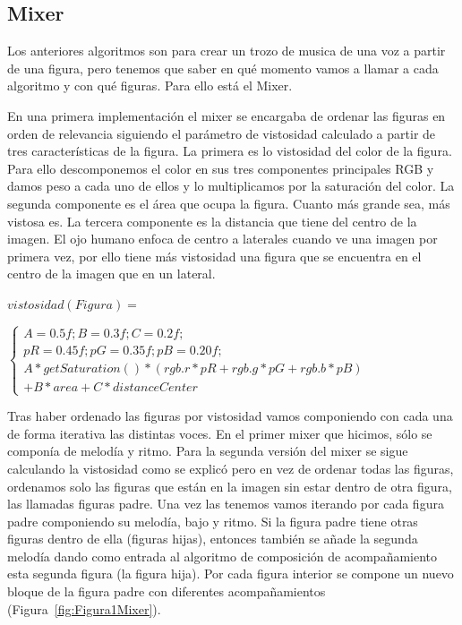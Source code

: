 
\subsection{Mixer}

Los anteriores algoritmos son para crear un trozo de musica de una voz a partir de una figura, pero tenemos que saber en qué momento vamos a llamar a cada algoritmo y con qué figuras. Para ello está el Mixer.

En una primera implementación el mixer se encargaba de ordenar las figuras en orden de relevancia siguiendo el parámetro de vistosidad calculado a partir de tres características de la figura.
La primera es lo vistosidad del color de la figura. Para ello descomponemos el color en sus tres componentes principales RGB y damos peso a cada uno de ellos y lo multiplicamos por la saturación del color.
La segunda componente es el área que ocupa la figura. Cuanto más grande sea, más vistosa es.
La tercera componente es la distancia que tiene del centro de la imagen. El ojo humano enfoca de centro a laterales cuando ve una imagen por primera vez, por ello tiene más vistosidad una figura que se encuentra en el centro de la imagen que en un lateral.

	\begin{center}
		$vistosidad(Figura) =$
	\end{center}
	\begin{center}
		
		$\left\{
		\begin{array}{cc}
		A = 0.5f; B = 0.3f; C = 0.2f;\\ 
		pR = 0.45f; pG = 0.35f; pB = 0.20f;\\
		A*getSaturation()*(rgb.r*pR + rgb.g*pG + rgb.b*pB)\\
		 + B*area + C*distanceCenter
		\end{array}\right.$
	\end{center}

Tras haber ordenado las figuras por vistosidad vamos componiendo con cada una de forma iterativa las distintas voces. En el primer mixer que hicimos, sólo se componía  de melodía y ritmo. Para la segunda versión del mixer se sigue calculando la vistosidad como se explicó pero en vez de ordenar todas las figuras, ordenamos solo las figuras que están en la imagen sin estar dentro de otra figura, las llamadas figuras padre. Una vez las tenemos vamos iterando por cada figura padre componiendo su melodía, bajo y ritmo. Si la figura padre tiene otras figuras dentro de ella (figuras hijas), entonces también se añade la segunda melodía dando como entrada al algoritmo de composición de acompañamiento esta segunda figura (la figura hija). Por cada figura interior se compone un nuevo bloque de la figura padre con diferentes acompañamientos (Figura~\ref{fig:Figura1Mixer}).

